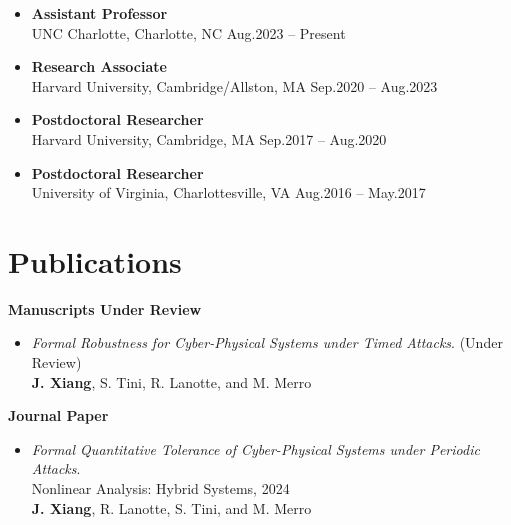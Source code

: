 \documentclass[11pt]{article}
\begin{document}
\begin{itemize}
  \item \textbf{Assistant Professor} \\
UNC Charlotte, Charlotte, NC \hfill Aug.2023 – Present
    \item \textbf{Research Associate} \\
Harvard University, Cambridge/Allston, MA \hfill Sep.2020 – Aug.2023
    \item \textbf{Postdoctoral Researcher} \\
Harvard University, Cambridge, MA \hfill Sep.2017 – Aug.2020
    \item \textbf{Postdoctoral Researcher}	\\
University of Virginia, Charlottesville, VA \hfill  Aug.2016 – May.2017
\end{itemize}





\section{Publications}


\textbf{Manuscripts Under Review}

\begin{itemize}
\item \textit{Formal Robustness for Cyber-Physical Systems under Timed
Attacks}. (Under Review) \\
\textbf{J. Xiang}, S. Tini, R. Lanotte, and M. Merro
%

\end{itemize}

\textbf{Journal Paper}

\begin{itemize}
  \item \textit{Formal Quantitative Tolerance of Cyber-Physical Systems under Periodic Attacks}. \\
  Nonlinear Analysis: Hybrid Systems, 2024 \\
  \textbf{J. Xiang}, R. Lanotte, S. Tini, and M. Merro
  


\end{itemize}
\end{document}
